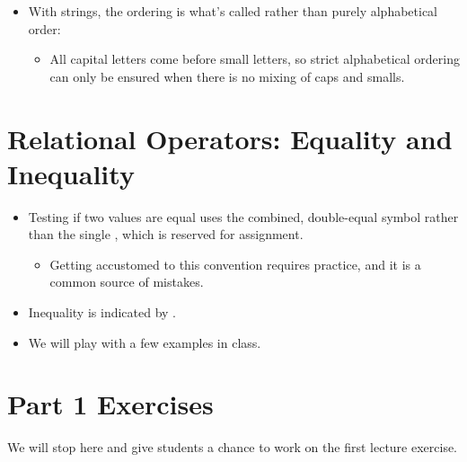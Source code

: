 \documentclass[letterpaper,10pt,english]{sphinxmanual}
\begin{document}
\begin{itemize}
\item {} 
With strings, the ordering is what’s called  rather
than purely alphabetical order:
\begin{itemize}
\item {} 
All capital letters come before small letters, so strict
alphabetical ordering can only be ensured when there is no
mixing of caps and smalls.

\end{itemize}

\end{itemize}


\section{Relational Operators: Equality and Inequality}
\label{\detokenize{lecture_notes/lec06_conditionals1:relational-operators-equality-and-inequality}}\begin{itemize}
\item {} 
Testing if two values are equal uses the combined, double-equal
symbol \sphinxcode{\sphinxupquote{==}} rather than the single \sphinxcode{\sphinxupquote{=}}, which is reserved for
assignment.
\begin{itemize}
\item {} 
Getting accustomed to this convention requires practice, and it
is a common source of mistakes.

\end{itemize}

\item {} 
Inequality is indicated by \sphinxcode{\sphinxupquote{!=}}.

\item {} 
We will play with a few examples in class.

\end{itemize}


\section{Part 1 Exercises}
\label{\detokenize{lecture_notes/lec06_conditionals1:part-1-exercises}}
We will stop here and give students a chance to work on the first
lecture exercise.
\end{document}
